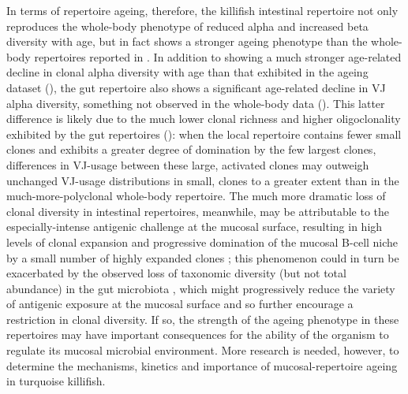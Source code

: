 In terms of repertoire ageing, therefore, the killifish intestinal repertoire not only reproduces the whole-body phenotype of reduced alpha and increased beta diversity with age, but in fact shows a stronger ageing phenotype than the whole-body repertoires reported in . In addition to showing a much stronger age-related decline in clonal alpha diversity with age than that exhibited in the ageing dataset (), the gut repertoire also shows a significant age-related decline in VJ alpha diversity, something not observed in the whole-body data (). This latter difference is likely due to the much lower clonal richness and higher oligoclonality exhibited by the gut repertoires (): when the local repertoire contains fewer small \naive clones and exhibits a greater degree of domination by the few largest clones, differences in VJ-usage between these large, activated clones may outweigh unchanged VJ-usage distributions in small, \naive clones to a greater extent than in the much-more-polyclonal whole-body repertoire. The much more dramatic loss of clonal diversity in intestinal repertoires, meanwhile, may be attributable to the especially-intense antigenic challenge at the mucosal surface, resulting in high levels of clonal expansion and progressive domination of the mucosal B-cell niche by a small number of highly expanded clones \parencite{caruso2009immunosenescence}; this phenomenon could in turn be exacerbated by the observed loss of taxonomic diversity (but not total abundance) in the gut microbiota \parencite{smith2017microbiota}, which might progressively reduce the variety of antigenic exposure at the mucosal surface and so further encourage a restriction in clonal diversity. If so, the strength of the ageing phenotype in these repertoires may have important consequences for the ability of the organism to regulate its mucosal microbial environment. More research is needed, however, to determine the mechanisms, kinetics and importance of mucosal-repertoire ageing in turquoise killifish.

